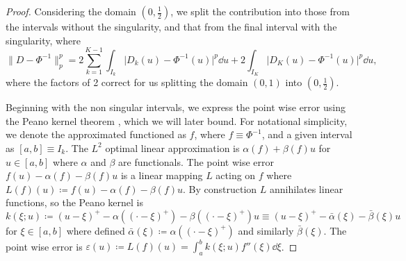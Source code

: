 \documentclass[manuscript,review]{acmart}
\begin{document}
\begin{proof}
Considering the domain $ (0, \tfrac{1}{2}) $, we split the contribution into those from the intervals without the singularity, and that from the final interval with the singularity, where
\begin{equation*}
\lVert D - \Phi^{-1}\rVert_p^p   = 2  \sum_{k=1}^{K-1} \int_{I_k} \lvert D_k(u) - \Phi^{-1}(u)\rvert^p \dd{u}  + 2 \int_{I_K} \lvert D_K(u) - \Phi^{-1}(u)\rvert^p \dd{u},
\end{equation*}
where the factors of 2 correct for us splitting the domain $ (0, 1) $ into $ (0, \tfrac{1}{2}) $. 

Beginning with the non singular intervals, we express the point wise error using the Peano kernel theorem \citep{iserles2009first,powell1981approximation}, which we will later bound. For notational simplicity, we denote the approximated functioned as $ f $, where $ f \equiv \Phi^{-1} $, and a given interval as $ [a,b] \equiv I_k  $. The $ L^2 $ optimal linear approximation is $ \alpha(f) + \beta(f) u $ for $ u \in [a,b] $ where $ \alpha $ and $ \beta $ are functionals. The point wise error $ f(u) - \alpha(f) - \beta(f)u $ is a linear mapping $ L $ acting on $ f $ where $ L(f)(u) \coloneqq  f(u) - \alpha(f) - \beta(f)u $. By construction $ L $ annihilates linear functions, so the Peano kernel is $ k(\xi; u) \coloneqq (u - \xi)^+ - \alpha((\cdot - \xi)^+) - \beta((\cdot - \xi)^+)u \equiv (u - \xi)^+ - \bar{\alpha}(\xi) - \bar{\beta}(\xi)u $ for $ \xi \in [a,b] $ where defined $ \bar{\alpha}(\xi) \coloneqq \alpha((\cdot - \xi)^+) $ and similarly $ \bar{\beta}(\xi) $. The point wise error is $ \varepsilon(u) \coloneqq L(f)(u) = \int_{a}^{b} k(\xi; u) f''(\xi) \dd{\xi} $.


\end{proof}
\end{document}
